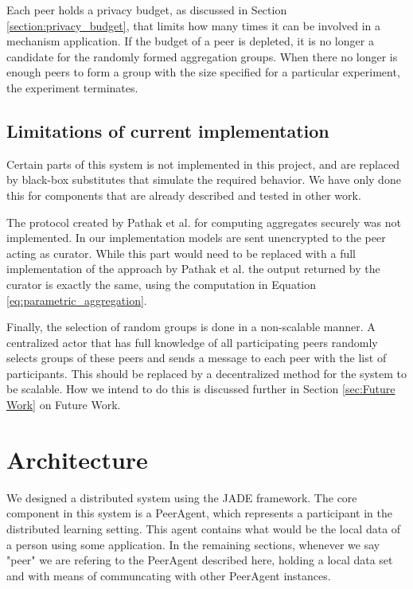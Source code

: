 Each peer holds a privacy budget, as discussed in Section \ref{section:privacy_budget}, that limits how many times it can be involved in a mechanism application. If the budget of a peer is depleted, it is no longer a candidate for the randomly formed aggregation groups. When there no longer is enough peers to form a group with the size specified for a particular experiment, the experiment terminates.

\subsection{Limitations of current implementation}

Certain parts of this system is not implemented in this project, and are replaced by black-box substitutes that simulate the required behavior. We have only done this for components that are already described and tested in other work. 

The protocol created by Pathak et al. for computing aggregates securely was not implemented. In our implementation models are sent unencrypted to the peer acting as curator. While this part would need to be replaced with a full implementation of the approach by Pathak et al. the output returned by the curator is exactly the same, using the computation in Equation \ref{eq:parametric_aggregation}. 

Finally, the selection of random groups is done in a non-scalable manner. A centralized actor that has full knowledge of all participating peers randomly selects groups of these peers and sends a message to each peer with the list of participants. This should be replaced by a decentralized method for the system to be scalable. How we intend to do this is discussed further in Section \ref{sec:Future Work} on Future Work.


\section{Architecture} \label{sec:architecture}

We designed a distributed system using the JADE framework. The core component in this system is a PeerAgent, which represents a participant in the distributed learning setting. This agent contains what would be the local data of a person using some application. In the remaining sections, whenever we say "peer" we are refering to the PeerAgent described here, holding a local data set and with means of communcating with other PeerAgent instances.

